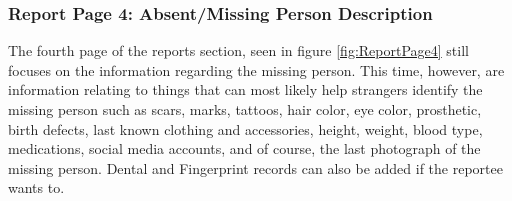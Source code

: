 \subsubsection{Report Page 4: Absent/Missing Person Description}

The fourth page of the reports section, seen in figure \ref{fig:ReportPage4} still focuses on the information regarding the missing person. This time, however, are information relating to things that can most likely help strangers identify the missing person such as scars, marks, tattoos, hair color, eye color, prosthetic, birth defects, last known clothing and accessories, height, weight, blood type, medications, social media accounts, and of course, the last photograph of the missing person. Dental and Fingerprint records can also be added if the reportee wants to.

